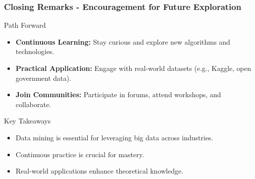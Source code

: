 \documentclass[aspectratio=169]{beamer}
\begin{document}
\begin{frame}[fragile]
    \frametitle{Closing Remarks - Encouragement for Future Exploration}
    \begin{block}{Path Forward}
        \begin{itemize}
            \item \textbf{Continuous Learning:} Stay curious and explore new algorithms and technologies.
            \item \textbf{Practical Application:} Engage with real-world datasets (e.g., Kaggle, open government data).
            \item \textbf{Join Communities:} Participate in forums, attend workshops, and collaborate.
        \end{itemize}
    \end{block}

    \begin{block}{Key Takeaways}
        \begin{itemize}
            \item Data mining is essential for leveraging big data across industries.
            \item Continuous practice is crucial for mastery.
            \item Real-world applications enhance theoretical knowledge.
        \end{itemize}
    \end{block}
\end{frame}
\end{document}
